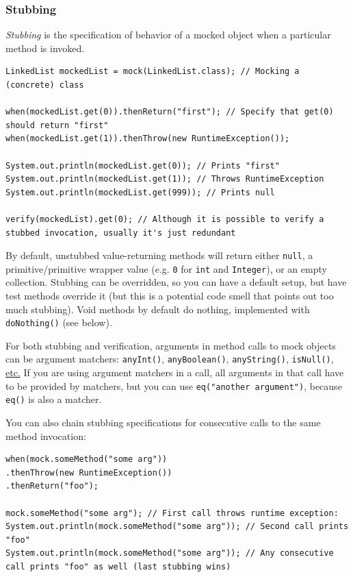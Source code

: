 \documentclass[table, xcdraw]{article}%
\begin{document}
\subsubsection{Stubbing}

\emph{Stubbing} is the specification of behavior of a mocked object when a particular method is invoked.

\begin{verbatim}
LinkedList mockedList = mock(LinkedList.class); // Mocking a (concrete) class

when(mockedList.get(0)).thenReturn("first"); // Specify that get(0) should return "first"
when(mockedList.get(1)).thenThrow(new RuntimeException());

System.out.println(mockedList.get(0)); // Prints "first"
System.out.println(mockedList.get(1)); // Throws RuntimeException
System.out.println(mockedList.get(999)); // Prints null

verify(mockedList).get(0); // Although it is possible to verify a stubbed invocation, usually it's just redundant
\end{verbatim}

By default, unstubbed value-returning methods will return either \texttt{null}, a primitive/primitive wrapper value (e.g. \texttt{0} for \texttt{int} and \texttt{Integer}), or an empty collection. Stubbing can be overridden, so you can have a default setup, but have test methods override it (but this is a potential code smell that points out too much stubbing). Void methods by default do nothing, implemented with \texttt{doNothing()} (see below).

For both stubbing and verification, arguments in method calls to mock objects can be argument matchers: \texttt{anyInt()}, \texttt{anyBoolean()}, \texttt{anyString()}, \texttt{isNull()}, \href{https://javadoc.io/static/org.mockito/mockito-core/5.15.2/org/mockito/ArgumentMatchers.html#method-summary}{etc.} If you are using argument matchers in a call, all arguments in that call have to be provided by matchers, but you can use \texttt{eq("another argument")}, because \texttt{eq()} is also a matcher.

You can also chain stubbing specifications for consecutive calls to the same method invocation:

\begin{verbatim}
when(mock.someMethod("some arg"))
.thenThrow(new RuntimeException())
.thenReturn("foo");

mock.someMethod("some arg"); // First call throws runtime exception:
System.out.println(mock.someMethod("some arg")); // Second call prints "foo"
System.out.println(mock.someMethod("some arg")); // Any consecutive call prints "foo" as well (last stubbing wins)
\end{verbatim}
\end{document}
